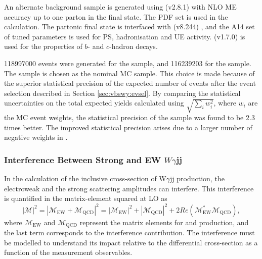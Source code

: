 An alternate \qcdwy background sample is generated using \MGNLO (v2.8.1) \cite{VBSWy:madgraph} with NLO ME accuracy up to one parton in the final state. The \NNPDF PDF set is used in the calculation. The partonic final state is interfaced with \PYTHIA (v8.244) \cite{Insitu:pythia}, and the A14 \cite{VBSWy:a14} set of tuned parameters is used for PS, hadronisation and UE activity. \EVTGEN (v1.7.0) \cite{Insitu:evtgen} is used for the properties of $b$- and $c$-hadron decays.

118997000 events were generated for the \MGNLO sample, and 116239203 for the \SHERPA sample. The \SHERPA sample is chosen as the nominal MC sample. This choice is made because of the superior statistical precision of the expected number of events after the event selection described in Section \ref{sec:vbswy:evsel}. By comparing the statistical uncertainties on the total expected yields calculated using $\sqrt{\sum_iw_i^2}$, where $w_i$ are the MC event weights, the statistical precision of the \SHERPA sample was found to be 2.3 times better. The improved statistical precision arises due to a larger number of negative weights in \MGNLO.%

\subsubsection{Interference Between Strong and EW $W\gamma$jj}

In the calculation of the inclusive cross-section of W$\gamma$jj production, the electroweak and the strong scattering amplitudes can interfere. This interference is quantified in the matrix-element squared at LO as 
\begin{equation} 
|\mathcal{M}|^2 = |\mathcal{M}_{\text{EW}} + \mathcal{M}_{\text{QCD}}|^2 = |\mathcal{M}_{\text{EW}}|^2+|\mathcal{M}_{\text{QCD}}|^2+2Re(\mathcal{M}_{\text{EW}}^*\mathcal{M}_{\text{QCD}}),
\end{equation}
where $\mathcal{M}_{\text{EW}}$ and $\mathcal{M}_{\text{QCD}}$ represent the matrix elements for \ewwy and \qcdwy production, and the last term corresponds to the interference contribution. The interference must be modelled to understand its impact relative to the \ewwy differential cross-section as a function of the measurement observables.

